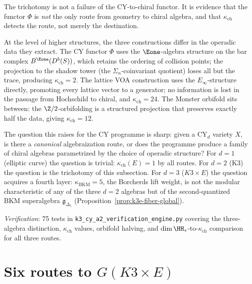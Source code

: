 \begin{remark}
\label{rem:k3-trichotomy-why}
The trichotomy is not a failure of the CY-to-chiral functor. It is evidence that
the functor $\Phi$ is \emph{not} the only route from geometry to chiral algebra,
and that $\kappa_{\mathrm{ch}}$ detects the route, not merely the destination.

At the level of higher structures, the three constructions differ in the operadic
data they extract. The CY functor $\Phi$ uses the $\Eone$-algebra structure on the
bar complex $B^{\Eone}(D^b(S))$, which retains the ordering of collision points;
the projection to the shadow tower (the $\Sigma_n$-coinvariant quotient) loses all
but the trace, producing $\kappa_{\mathrm{ch}} = 2$. The lattice VOA
construction uses the $E_\infty$-structure directly, promoting every lattice vector
to a generator; no information is lost in the passage from Hochschild to chiral,
and $\kappa_{\mathrm{ch}} = 24$. The Monster orbifold sits between:
the $\Z/2$-orbifolding is a structured projection that preserves exactly half the
data, giving $\kappa_{\mathrm{ch}} = 12$.

The question this raises for the CY programme is sharp: given a CY$_d$
variety $X$, is there a \emph{canonical} algebraization route, or does the
programme produce a family of chiral algebras parametrized by the choice of
operadic structure? For $d = 1$ (elliptic curve) the question is trivial:
$\kappa_{\mathrm{ch}}(E) = 1$ by all routes. For $d = 2$ (K3) the question is
the trichotomy of this subsection. For $d = 3$ ($K3 \times E$) the question
acquires a fourth layer: $\kappa_{\mathrm{BKM}} = 5$, the Borcherds lift weight,
is not the modular characteristic of any of the three $d = 2$ algebras but of the
second-quantized BKM superalgebra $\mathfrak{g}_{\Delta_5}$ (Proposition~\ref{prop:k3e-fiber-global}).
\end{remark}

\noindent\textit{Verification}: 75 tests in \texttt{k3\_cy\_a2\_verification\_engine.py} covering the three-algebra distinction, $\kappa_{\mathrm{ch}}$ values, orbifold halving, and $\dim \HH_*$-to-$\kappa_{\mathrm{ch}}$ comparison for all three routes.


\section{Six routes to $G(K3 \times E)$}
\label{sec:k3e-five-routes}

